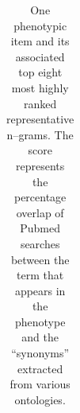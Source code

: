 \documentclass{sig-alternate-05-2015}
\begin{document}
\begin{table}
\begin{center}
\begin{tabular}{l l}
%
\bottomrule
\end{tabular}
\end{center}
\caption{One phenotypic item and its associated top eight most highly ranked representative n--grams. The score represents the percentage overlap of Pubmed searches between the term that appears in the phenotype and the ``synonyms'' extracted from various ontologies.}
\label{tab:pheno-n-gram}
\end{table}
\end{document}
